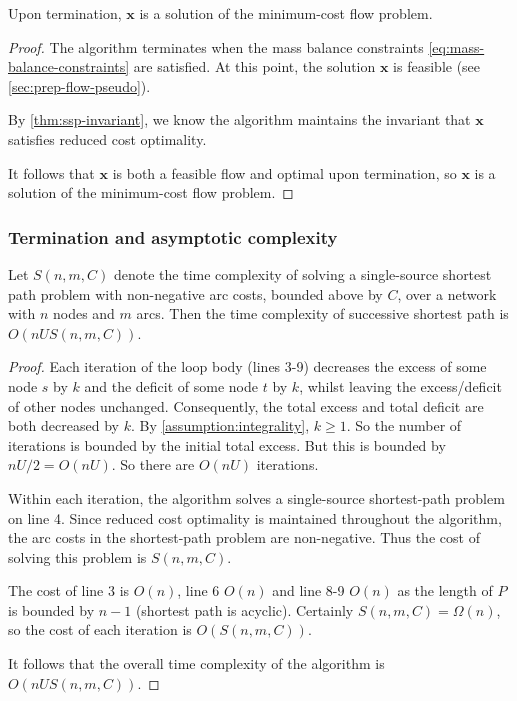 \begin{thm} \label{thm:ssp-correctness}
Upon termination, $\mathbf{x}$ is a solution of the minimum-cost flow problem.
\end{thm}
\begin{proof}
The algorithm terminates when the mass balance constraints \cref{eq:mass-balance-constraints} are satisfied. At this point, the solution $\mathbf{x}$ is feasible (see \cref{sec:prep-flow-pseudo}). 

By \cref{thm:ssp-invariant}, we know the algorithm maintains the invariant that $\mathbf{x}$ satisfies reduced cost optimality. 

It follows that $\mathbf{x}$ is both a feasible flow and optimal upon termination, so $\mathbf{x}$ is a solution of the minimum-cost flow problem.
\end{proof}

\subsubsection{Termination and asymptotic complexity}

\begin{thm} \label{thm:ssp-complexity}
Let $S(n,m,C)$ denote the time complexity of solving a single-source shortest path problem with non-negative arc costs, bounded above by $C$, over a network with $n$ nodes and $m$ arcs. Then the time complexity of successive shortest path is $O(nUS(n,m,C))$.
\end{thm}
\begin{proof}
Each iteration of the loop body (lines 3-9) decreases the excess of some node $s$ by $k$ and the deficit of some node $t$ by $k$, whilst leaving the excess/deficit of other nodes unchanged. Consequently, the total excess and total deficit are both decreased by $k$. By \cref{assumption:integrality}, $k \geq 1$. So the number of iterations is bounded by the initial total excess. But this is bounded by $nU/2 = O(nU)$. So there are $O(nU)$ iterations.

Within each iteration, the algorithm solves a single-source shortest-path problem on line 4. Since reduced cost optimality is maintained throughout the algorithm, the arc costs in the shortest-path problem are non-negative\footnotemark. Thus the cost of solving this problem is $S(n,m,C)$.

The cost of line 3 is $O(n)$, line 6 $O(n)$ and line 8-9 $O(n)$ as the length of $P$ is bounded by $n-1$ (shortest path is acyclic). Certainly $S(n,m,C) = \Omega(n)$, so the cost of each iteration is $O(S(n,m,C))$.

It follows that the overall time complexity of the algorithm is $O(nUS(n,m,C))$.
\end{proof}

